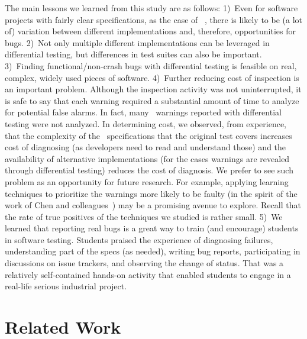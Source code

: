 \documentclass[smallextended]{svjour3}
\begin{document}
The main lessons we learned from this study are as follows: 1)~Even
for software projects with fairly clear specifications, as the case of
\javascript{}~\cite{ecmas262-spec}, there is likely to be (a lot of)
variation between different implementations and, therefore,
opportunities for bugs. 2)~Not only multiple different implementations
can be leveraged in differential testing, but differences in test
suites can also be important. 3)~Finding functional/non-crash bugs
with differential testing is feasible on real, complex, widely used
pieces of software. 4)~Further reducing cost of inspection is an
important problem. Although the inspection activity was not
uninterrupted, it is safe to say that each warning required a
substantial amount of time to analyze for potential false alarms. In
fact, many \hi\ warnings reported with differential testing were not
analyzed. In determining cost, we observed, from experience, that the
complexity of the \js\ specifications that the original test covers
increases cost of diagnosing (as developers need to read and
understand those) and the availability of alternative implementations
(for the cases warnings are revealed through differential testing)
reduces the cost of diagnosis. We prefer to see such problem as an
opportunity for future research. For example, applying learning
techniques to prioritize the warnings more likely to be faulty (in the
spirit of the work of Chen and
colleagues~\cite{Chen:2017:LPT:3097368.3097451}) may be a promising
avenue to explore. Recall that the rate of true positives of the
techniques we studied is rather small.  5)~We learned that reporting
real bugs is a great way to train (and encourage) students in software
testing. Students praised the experience of diagnosing failures,
understanding part of the specs (as needed), writing bug reports,
participating in discussions on issue trackers, and observing the
change of status. That was a relatively self-contained hands-on
activity that enabled students to engage in a real-life serious
industrial project.

\section{Related Work}
\label{sec:related-work}
\end{document}
